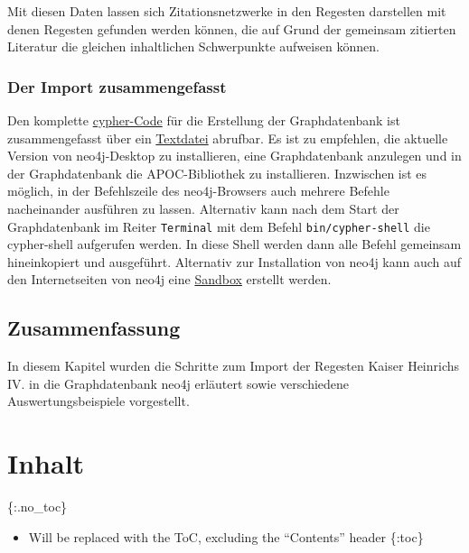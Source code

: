 \documentclass[ngerman,]{scrreprt}
\providecommand{\tightlist}{%
  \setlength{\itemsep}{0pt}\setlength{\parskip}{0pt}}
\begin{document}
Mit diesen Daten lassen sich Zitationsnetzwerke in den Regesten darstellen mit denen Regesten gefunden werden können, die auf Grund der gemeinsam zitierten Literatur die gleichen inhaltlichen Schwerpunkte aufweisen können.

\hypertarget{der-import-zusammengefasst}{%
\subsection{Der Import zusammengefasst}\label{der-import-zusammengefasst}}

Den komplette \href{cypher/20_cypher-Datenbankerstellung.txt}{cypher-Code} für die Erstellung der Graphdatenbank ist zusammengefasst über ein \href{cypher/20_cypher-Datenbankerstellung.txt}{Textdatei} abrufbar. Es ist zu empfehlen, die aktuelle Version von neo4j-Desktop zu installieren, eine Graphdatenbank anzulegen und in der Graphdatenbank die APOC-Bibliothek zu installieren. Inzwischen ist es möglich, in der Befehlszeile des neo4j-Browsers auch mehrere Befehle nacheinander ausführen zu lassen. Alternativ kann nach dem Start der Graphdatenbank im Reiter \texttt{Terminal} mit dem Befehl \texttt{bin/cypher-shell} die cypher-shell aufgerufen werden. In diese Shell werden dann alle Befehl gemeinsam hineinkopiert und ausgeführt. Alternativ zur Installation von neo4j kann auch auf den Internetseiten von neo4j eine \href{https://neo4j.com/lp/try-neo4j-sandbox}{Sandbox} erstellt werden.

\hypertarget{zusammenfassung-2}{%
\section{Zusammenfassung}\label{zusammenfassung-2}}

In diesem Kapitel wurden die Schritte zum Import der Regesten Kaiser Heinrichs IV. in die Graphdatenbank neo4j erläutert sowie verschiedene Auswertungsbeispiele vorgestellt.

\hypertarget{inhalt-4}{%
\chapter{Inhalt}\label{inhalt-4}}

\{:.no\_toc\}

\begin{itemize}
\tightlist
\item
  Will be replaced with the ToC, excluding the ``Contents'' header \{:toc\}
\end{itemize}
\end{document}
